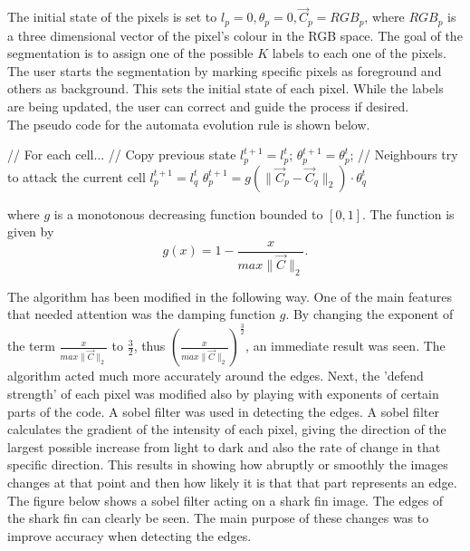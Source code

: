 \documentclass[a4paper,10pt]{article}
\newcommand{\note}{\todo}
\begin{document}
The initial state of the pixels is set to $l_{p} = 0, \theta_{p} = 0,
\overrightarrow{C}_{p} = RGB_{p}$, where $RGB_{p}$ is a three dimensional vector
of the pixel's colour in 
the RGB space.  The goal of the segmentation is to assign one of the possible
$K$ labels to each one of the pixels.  The user starts the segmentation by
marking specific pixels as foreground and others as background.  This sets the
initial state of each pixel.  While the labels are being updated, the user can
correct and guide the process if desired.  \\

\newpage
\noindent The pseudo code for the automata evolution rule is shown below. 
\begin{algorithm}[H]
\begin{algorithmic}[1]
 \State // For each cell...
 \State // Copy previous state
 \State $l^{t+1}_{p} = l^{t}_{p}$;
 \State $\theta_{p}^{t+1} = \theta_{p}^{t}$;
 \State // Neighbours try to attack the current cell
 \State $l^{t+1}_{p} = l^{t}_{q}$
 \State $\theta^{t+1}_{p} = g(\| \overrightarrow{C}_{p} - \overrightarrow{C}_{q}
\|_{2}) \cdot \theta^{t}_{q}$
 \EndIf
 \EndFor
 \EndFor
\end{algorithmic}
\end{algorithm}

\noindent where $g$ is a monotonous decreasing function bounded to $[0, 1]$. 
The function is given by
\[
g(x) = 1 - \frac{x}{max\| \overrightarrow{C} \|_{2}}. 
\]


\noindent The algorithm has been modified in the following way.  One of the
main features that needed attention was the damping function $g$.  By changing
the exponent of the term $\frac{x}{max\| \overrightarrow{C} \|_{2}}$ to
$\frac{3}{2}$, thus $\left ({\frac{x}{max\| \overrightarrow{C} \|_{2}}}\right
) ^\frac{3}{2}$,
an immediate result was seen.  The algorithm acted much more accurately around
the edges.  Next, the 'defend strength' of each pixel was modified also by
playing with exponents
of certain parts of the code.\note{yes, but why? explain what's happening!}  A
sobel filter was used in detecting the edges.  A sobel filter calculates the
gradient of the intensity of each pixel, giving
the direction of the largest possible increase from light to dark and also the
rate of change in that specific direction.   This results in showing how
abruptly or smoothly the images changes at that point and then how likely it
is that that part represents an edge.  The figure below shows a sobel filter
acting on a shark fin image.  The edges of the shark fin can clearly be seen.
The main purpose of these changes was to improve accuracy when detecting the
edges.  \\
\end{document}
